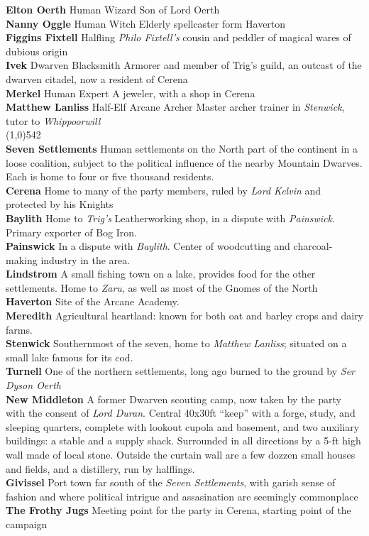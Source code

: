 \documentclass[letterpaper]{article}
\newcommand{\fullline}{\noindent\line(1,0){542} \\}
\newcommand{\person}[3]{\noindent\textbf{#1
    \ifstrequal{#2}{M}{{\color{ProcessBlue}\male}}{%
    \ifstrequal{#2}{F}{\color{VioletRed}\female}{}}}{\scriptsize #3}}
\begin{document}
\indent\person{Elton Oerth}{M}{Human Wizard} Son of Lord Oerth \\
\indent\person{Nanny Oggle}{F}{Human Witch} Elderly spellcaster form Haverton \\
\indent\person{Figgins Fixtell}{M}{Halfling} \emph{Philo Fixtell's} cousin and peddler of magical wares of dubious origin \\
\person{Ivek}{M}{Dwarven Blacksmith} Armorer and member of Trig's guild, an outcast of the dwarven citadel, now a resident of Cerena \\
\person{Merkel}{F}{Human Expert} A jeweler, with a shop in Cerena \\
\person{Matthew Lanliss}{M}{Half-Elf Arcane Archer} Master archer trainer in \emph{Stenwick}, tutor to \emph{Whippoorwill} \\


\vspace{-1.75em}
\fullline
\textbf{Seven Settlements} Human settlements on the North part of the continent in a loose coalition, subject to the political influence of the nearby Mountain Dwarves. Each is home to four or five thousand residents. \\
\indent\textbf{Cerena} Home to many of the party members, ruled by \emph{Lord Kelvin} and protected by his Knights \\
\indent\textbf{Baylith} Home to \emph{Trig's} Leatherworking shop, in a dispute with \emph{Painswick}. Primary exporter of Bog Iron. \\
\indent\textbf{Painswick} In a dispute with \emph{Baylith}. Center of woodcutting and charcoal-making industry in the area. \\
\indent\textbf{Lindstrom} A small fishing town on a lake, provides food for the other settlements.  Home to \emph{Zaru}, as well as most of the Gnomes of the North \\
\indent\textbf{Haverton} Site of the Arcane Academy. \\
\indent\textbf{Meredith} Agricultural heartland: known for both oat and barley crops and dairy farms. \\
\indent\textbf{Stenwick} Southernmost of the seven, home to \emph{Matthew Lanliss}; situated on a small lake famous for its cod. \\
\textbf{Turnell} One of the northern settlements, long ago burned to the ground by \emph{Ser Dyson Oerth} \\
\textbf{New Middleton} A former Dwarven scouting camp, now taken by the party with the consent of \emph{Lord Duran}.  Central 40x30ft ``keep'' with a forge, study, and sleeping quarters, complete with lookout cupola and basement, and two auxiliary buildings: a stable and a supply shack. Surrounded in all directions by a 5-ft high wall made of local stone. Outside the curtain wall are a few dozzen small houses and fields, and a distillery, run by halflings. \\
\textbf{Givissel} Port town far south of the \emph{Seven Settlements}, with garish sense of fashion and where political intrigue and assasination are seemingly commonplace \\
\textbf{The Frothy Jugs} Meeting point for the party in Cerena, starting point of the campaign\\
\end{document}
